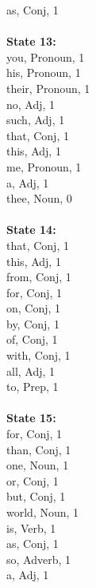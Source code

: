 \begin{multicols}{4}
as, Conj, 1\\
\\
\textbf{State 13:} \\
you, Pronoun, 1\\
his, Pronoun, 1\\
their, Pronoun, 1\\
no, Adj, 1\\
such, Adj, 1\\
that, Conj, 1\\
this, Adj, 1\\
me, Pronoun, 1\\
a, Adj, 1\\
thee, Noun, 0\\
\\
\textbf{State 14:} \\
that, Conj, 1\\
this, Adj, 1\\
from, Conj, 1\\
for, Conj, 1\\
on, Conj, 1\\
by, Conj, 1\\
of, Conj, 1\\
with, Conj, 1\\
all, Adj, 1\\
to, Prep, 1\\
\\
\textbf{State 15:} \\
for, Conj, 1\\
than, Conj, 1\\
one, Noun, 1\\
or, Conj, 1\\
but, Conj, 1\\
world, Noun, 1\\
is, Verb, 1\\
as, Conj, 1\\
so, Adverb, 1\\
a, Adj, 1\\

\end{multicols}



